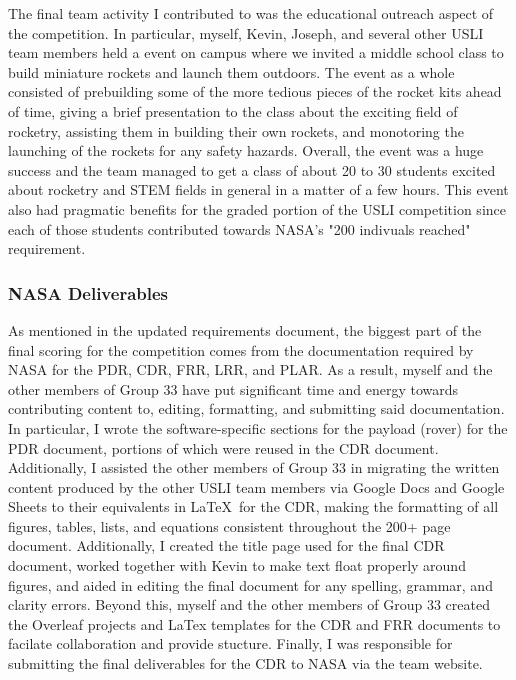 \documentclass[onecolumn, draftclsnofoot,10pt, compsoc]{IEEEtran}
\begin{document}
The final team activity I contributed to was the educational outreach aspect of the competition. In particular, myself, Kevin, Joseph, and several other USLI team members held a event on campus where we invited a middle school class to build miniature rockets and launch them outdoors. The event as a whole consisted of prebuilding some of the more tedious pieces of the rocket kits ahead of time, giving a brief presentation to the class about the exciting field of rocketry, assisting them in building their own rockets, and monotoring the launching of the rockets for any safety hazards. Overall, the event was a huge success and the team managed to get a class of about 20 to 30 students excited about rocketry and STEM fields in general in a matter of a few hours. This event also had pragmatic benefits for the graded portion of the USLI competition since each of those students contributed towards NASA's "200 indivuals reached" requirement.

\subsubsection{NASA Deliverables}
As mentioned in the updated requirements document, the biggest part of the final scoring for the competition comes from the documentation required by NASA for the PDR, CDR, FRR, LRR, and PLAR. As a result, myself and the other members of Group 33 have put significant time and energy towards contributing content to, editing, formatting, and submitting said documentation. In particular, I wrote the software-specific sections for the payload (rover) for the PDR document, portions of which were reused in the CDR document. Additionally, I assisted the other members of Group 33 in migrating the written content produced by the other USLI team members via Google Docs and Google Sheets to their equivalents in \LaTeX~for the CDR, making the formatting of all figures, tables, lists, and equations consistent throughout the 200+ page document. Additionally, I created the title page used for the final CDR document, worked together with Kevin to make text float properly around figures, and aided in editing the final document for any spelling, grammar, and clarity errors. Beyond this, myself and the other members of Group 33 created the Overleaf projects and LaTex templates for the CDR and FRR documents to facilate collaboration and provide stucture. Finally, I was responsible for submitting the final deliverables for the CDR to NASA via the team website.
\end{document}

